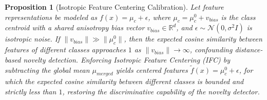 \documentclass[twoside]{article}
\newtheorem{proposition}{Proposition}
\begin{document}
\begin{proposition}[Isotropic Feature Centering Calibration]
Let feature representations be modeled as $f(x) = \mu_c + \epsilon$, where $\mu_c = \mu_c^0 + v_{bias}$ is the class centroid with a shared anisotropy bias vector $v_{bias} \in \mathbb{R}^d$, and $\epsilon \sim \mathcal{N}(0, \sigma^2 I)$ is isotropic noise. If $\|v_{bias}\| \gg \|\mu_c^0\|$, then the expected cosine similarity between features of different classes approaches $1$ as $\|v_{bias}\| \to \infty$, confounding distance-based novelty detection. Enforcing Isotropic Feature Centering (IFC) by subtracting the global mean $\mu_{merged}$ yields centered features $\tilde{f}(x) = \mu_c^0 + \epsilon$, for which the expected cosine similarity between different classes is bounded and strictly less than $1$, restoring the discriminative capability of the novelty detector.
\end{proposition}
\end{document}
